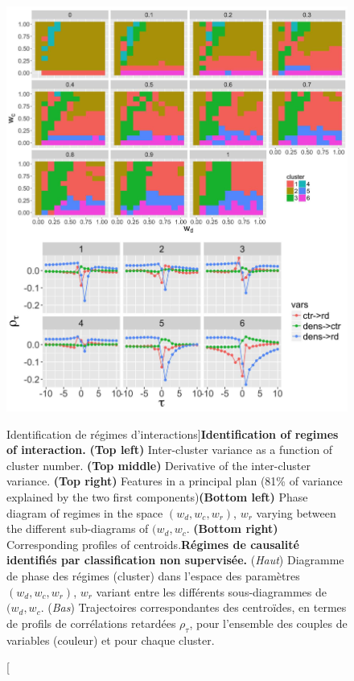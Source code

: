 \begin{figure}
\includegraphics[width=\linewidth]{Figures/Final/4-2-2-fig-causalityregimes-clustering.jpg}
\caption[Identification of interaction regimes][Identification de régimes d'interactions]{\textbf{Identification of regimes of interaction.} \textbf{(Top left)} Inter-cluster variance as a function of cluster number. \textbf{(Top middle)} Derivative of the inter-cluster variance. \textbf{(Top right)} Features in a principal plan (81\% of variance explained by the two first components)\textbf{(Bottom left)} Phase diagram of regimes in the space $(w_{d},w_{c},w_{r})$, $w_r$ varying between the different sub-diagrams of $(w_{d},w_{c}$. \textbf{(Bottom right)} Corresponding profiles of centroids.\label{fig:causalityregimes:clustering}}{\textbf{Régimes de causalité identifiés par classification non supervisée.} (\textit{Haut}) Diagramme de phase des régimes (cluster) dans l'espace des paramètres $(w_{d},w_{c},w_{r})$, $w_r$ variant entre les différents sous-diagrammes de $(w_{d},w_{c}$. (\textit{Bas}) Trajectoires correspondantes des centroïdes, en termes de profils de corrélations retardées $\rho_{\tau}$, pour l'ensemble des couples de variables (couleur) et pour chaque cluster.\label{fig:causalityregimes:clustering}}
\end{figure}



